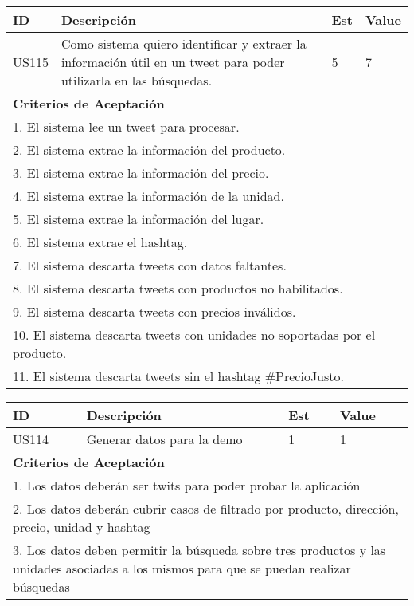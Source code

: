 \documentclass[a4paper,8pt]{article}
\begin{document}
\bigskip
\begin{tabular}{|p{1cm}|p{10cm}|p{1cm}|p{1cm}|}
\hline
\hline
\textbf{ID}&\textbf{Descripción}&\textbf{Est}&\textbf{Value}\\
\hline
\hline
US115&Como sistema quiero identificar y extraer la información útil en un tweet para poder utilizarla en las búsquedas.&5&7\\
\hline
\hline
\multicolumn{4}{|p{13cm}|}{ \textbf{Criterios de Aceptación}} \\
\hline
\hline
\multicolumn{4}{|p{13cm}|}{1. El sistema lee un tweet para procesar.}\\
\multicolumn{4}{|p{13cm}|}{2. El sistema extrae la información del producto.}\\
\multicolumn{4}{|p{13cm}|}{3. El sistema extrae la información del precio.}\\
\multicolumn{4}{|p{13cm}|}{4. El sistema extrae la información de la unidad.}\\
\multicolumn{4}{|p{13cm}|}{5. El sistema extrae la información del lugar.}\\
\multicolumn{4}{|p{13cm}|}{6. El sistema extrae el hashtag.}\\
\multicolumn{4}{|p{13cm}|}{7. El sistema descarta tweets con datos faltantes.}\\
\multicolumn{4}{|p{13cm}|}{8. El sistema descarta tweets con productos no habilitados.}\\
\multicolumn{4}{|p{13cm}|}{9. El sistema descarta tweets con precios inválidos.}\\
\multicolumn{4}{|p{13cm}|}{10. El sistema descarta tweets con unidades no soportadas por el producto.}\\
\multicolumn{4}{|p{13cm}|}{11. El sistema descarta tweets sin el hashtag $\#$PrecioJusto.}\\
\hline
\hline
\end{tabular}



\bigskip
\begin{tabular}{|p{1cm}|p{10cm}|p{1cm}|p{1cm}|}
\hline
\hline
\textbf{ID}&\textbf{Descripción}&\textbf{Est}&\textbf{Value}\\
\hline
\hline
US114&Generar datos para la demo&1&1\\
\hline
\hline
\multicolumn{4}{|p{13cm}|}{ \textbf{Criterios de Aceptación}} \\
\hline
\hline
\multicolumn{4}{|p{13cm}|}{1. Los datos deberán ser twits para poder probar la aplicación}\\
\multicolumn{4}{|p{13cm}|}{2. Los datos deberán cubrir casos de filtrado por producto, dirección, precio, unidad y hashtag}\\
\multicolumn{4}{|p{13cm}|}{3. Los datos deben permitir la búsqueda sobre tres productos y las unidades asociadas a los mismos para que se puedan realizar búsquedas}\\
\hline
\hline
\end{tabular}
\end{document}
